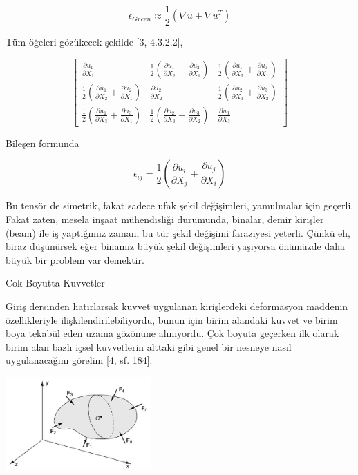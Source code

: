 \documentclass[12pt,fleqn]{article}\usepackage{../../common}
\begin{document}
$$
\epsilon_{Green} \approx \frac{1}{2} (\nabla u + \nabla u^T )
$$

Tüm öğeleri gözükecek şekilde [3, 4.3.2.2], 

$$
\left[\begin{array}{ccc}
  \frac{\partial u_1}{\partial X_1} &
  \frac{1}{2}(\frac{\partial u_1}{\partial X_2} + \frac{\partial u_2}{\partial X_1} ) & 
  \frac{1}{2}(\frac{\partial u_1}{\partial X_3} + \frac{\partial u_3}{\partial  X_1} )
\\
  \frac{1}{2}(\frac{\partial u_1}{\partial X_2} + \frac{\partial u_2}{\partial X_1} ) &
  \frac{\partial u_2}{\partial X_2} &
  \frac{1}{2}(\frac{\partial u_2}{\partial X_3} + \frac{\partial u_3}{\partial X_2} )
\\
  \frac{1}{2}(\frac{\partial u_1}{\partial X_3} + \frac{\partial u_3}{\partial X_1} ) &
  \frac{1}{2}(\frac{\partial u_2}{\partial X_3} + \frac{\partial u_3}{\partial X_2} ) &
  \frac{\partial u_3}{\partial X_3} 
\end{array}\right]
$$

Bileşen formunda

$$
\epsilon_{ij} = \frac{1}{2}\left(
\frac{\partial u_i}{\partial X_j} + \frac{\partial u_j}{\partial X_i}
\right)
$$

Bu tensör de simetrik, fakat sadece ufak şekil değişimleri, yamulmalar için
geçerli. Fakat zaten, mesela inşaat mühendisliği durumunda, binalar, demir
kirişler (beam) ile iş yaptığımız zaman, bu tür şekil değişimi faraziyesi
yeterli. Çünkü eh, biraz düşünürsek eğer binamız büyük şekil değişimleri
yaşıyorsa önümüzde daha büyük bir problem var demektir.

Cok Boyutta Kuvvetler

Giriş dersinden hatırlarsak kuvvet uygulanan kirişlerdeki deformasyon maddenin
özellikleriyle ilişkilendirilebiliyordu, bunun için birim alandaki kuvvet ve
birim boya tekabül eden uzama gözönüne alınıyordu. Çok boyuta geçerken ilk
olarak birim alan bazlı içsel kuvvetlerin alttaki gibi genel bir nesneye nasıl
uygulanacağını görelim [4, sf. 184].

\includegraphics[width=15em]{phy_020_strs_02_16.jpg}
\end{document}
